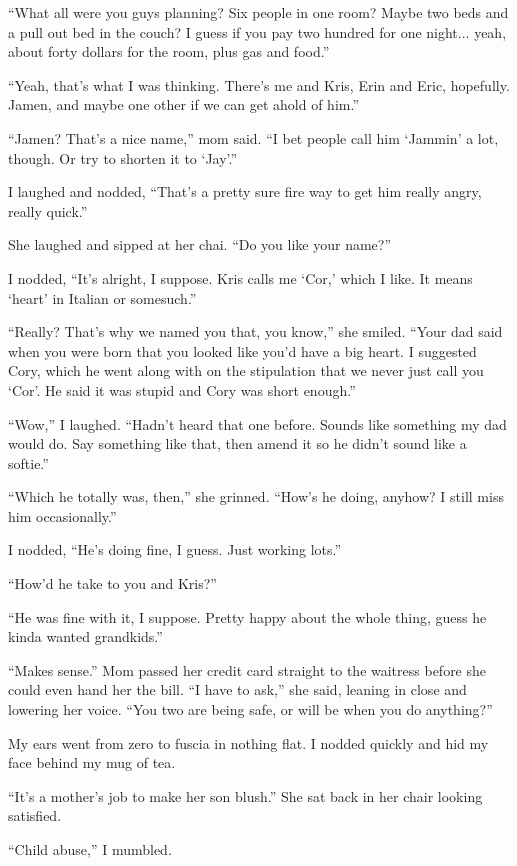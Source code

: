 ``What all were you guys planning?  Six people in one room?  Maybe two beds and a pull out bed in the couch?  I guess if you pay two hundred for one night... yeah, about forty dollars for the room, plus gas and food.''

``Yeah, that's what I was thinking.  There's me and Kris, Erin and Eric, hopefully.  Jamen, and maybe one other if we can get ahold of him.''

``Jamen?  That's a nice name,'' mom said.  ``I bet people call him `Jammin' a lot, though.  Or try to shorten it to `Jay'.''

I laughed and nodded, ``That's a pretty sure fire way to get him really angry, really quick.''

She laughed and sipped at her chai.  ``Do you like your name?''

I nodded, ``It's alright, I suppose.  Kris calls me `Cor,' which I like.  It means `heart' in Italian or somesuch.''

``Really?  That's why we named you that, you know,'' she smiled.  ``Your dad said when you were born that you looked like you'd have a big heart.  I suggested Cory, which he went along with on the stipulation that we never just call you `Cor'.  He said it was stupid and Cory was short enough.''

``Wow,'' I laughed.  ``Hadn't heard that one before.  Sounds like something my dad would do.  Say something like that, then amend it so he didn't sound like a softie.''

``Which he totally was, then,'' she grinned.  ``How's he doing, anyhow?  I still miss him occasionally.''

I nodded, ``He's doing fine, I guess.  Just working lots.''

``How'd he take to you and Kris?''

``He was fine with it, I suppose.  Pretty happy about the whole thing, guess he kinda wanted grandkids.''

``Makes sense.''  Mom passed her credit card straight to the waitress before she could even hand her the bill.  ``I have to ask,'' she said, leaning in close and lowering her voice.  ``You two are being safe, or will be when you do anything?''

My ears went from zero to fuscia in nothing flat.  I nodded quickly and hid my face behind my mug of tea.

``It's a mother's job to make her son blush.''  She sat back in her chair looking satisfied.

``Child abuse,'' I mumbled.


